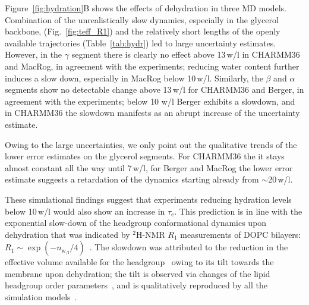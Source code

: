 \documentclass[journal=jpcbfk,manuscript=article,layout=twocolumn]{achemso}
\begin{document}
Figure~\ref{fig:hydration}B shows the effects of dehydration in three MD models.
Combination of
the unrealistically slow dynamics, especially in the glycerol backbone, (Fig.~\ref{fig:teff_R1}) and
the relatively short lengths of the openly available trajectories %
(Table~\ref{tab:hydr})
led to large uncertainty estimates. %
%
However, in the $\gamma$ segment
there is clearly no effect above 13\,w/l in CHARMM36 and MacRog,
in agreement with the experiments;
reducing water content further induces a slow down, 
especially in MacRog below 10\,w/l. 
%
Similarly, the
$\beta$ and $\alpha$ segments
show no detectable change above 13\,w/l
for CHARMM36 and Berger,
in agreement with the experiments;
below 10 w/l Berger exhibits a slowdown, and
in CHARMM36 the slowdown manifests as an abrupt increase of the uncertainty estimate.

Owing to the large uncertainties, we only point out the qualitative trends of the lower error estimates on the glycerol segments.
For CHARMM36 the it stays almost constant all the way until 7\,w/l,
for Berger and MacRog the lower error estimate suggests a retardation of the dynamics starting already from $\sim$20\,w/l.

These simulational findings suggest that
experiments reducing hydration levels below 10\,w/l would also show an increase in $\tau_\mathrm e$.
This prediction is in line with the
exponential slow-down
of the headgroup conformational dynamics
upon dehydration that was indicated by $^2$H-NMR $R_{1}$ measurements
of DOPC bilayers:
$R_1\sim\exp(-n_{{\mathrm w\!}_{/\mathrm l}}/4)$~\cite{ulrich94}.
%
The slowdown was attributed to the reduction in the effective volume available for the headgroup~\cite{ulrich94}
owing to its tilt towards the membrane upon dehydration;
the tilt is observed via changes of the lipid headgroup order parameters~\cite{bechinger91},
and is qualitatively reproduced by all the simulation models~\cite{botan15}.

\end{document}
